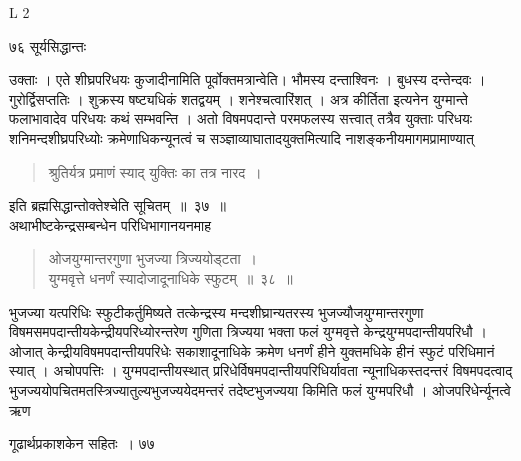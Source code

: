 \documentclass[11pt, openany]{book}
\begin{document}
{\tiny{L 2}}

\newpage

\noindent७६ \hspace{4cm} सूर्यसिद्धान्तः
\vspace{1cm}

\begin{sloppypar}
\noindent उक्ताः । एते शीघ्रपरिधयः कुजादीनामिति पूर्वोक्तमत्रान्वेति। भौमस्य दन्ताश्विनः । बुधस्य दन्तेन्दवः । गुरोर्द्विसप्ततिः । शुक्रस्य षष्ट्यधिकं शतद्वयम् । शनेश्चत्वारिंशत् । अत्र कीर्तिता इत्यनेन युग्मान्ते फलाभावादेव परिधयः कथं सम्भवन्ति । अतो विषमपदान्ते परमफलस्य सत्त्वात् तत्रैव युक्ताः परिधयः शनिमन्दशीघ्रपरिध्योः क्रमेणाधिकन्यूनत्वं च सञ्ज्ञाव्याघातादयुक्तमित्यादि नाशङ्कनीयमागमप्रामाण्यात्\textendash
\end{sloppypar}


\begin{quote}
{\qt श्रुतिर्यत्र प्रमाणं स्याद् युक्तिः का तत्र नारद~।}
\end{quote}
\begin{sloppypar}

इति ब्रह्मसिद्धान्तोक्तेश्चेति सूचितम्~॥~३७~॥\\
अथाभीष्टकेन्द्रसम्बन्धेन परिधिभागानयनमाह\textendash
\end{sloppypar}
\begin{quote}

{\ssi ओजयुग्मान्तरगुणा भुजज्या त्रिज्ययोड्टता~।\\
युग्मवृत्ते धनर्णं स्यादोजादूनाधिके स्फुटम्~॥~३८~॥}
\end{quote}
\begin{sloppypar}
भुजज्या यत्परिधिः स्फुटीकर्तुमिष्यते तत्केन्द्रस्य मन्दशीघ्रान्यतरस्य भुजज्यौजयुग्मान्तरगुणा विषमसमपदान्तीयकेन्द्रीयपरिध्योरन्तरेण गुणिता त्रिज्यया भक्ता फलं युग्मवृत्ते केन्द्रयुग्मपदान्तीयपरिधौ । ओजात् केन्द्रीयविषमपदान्तीयपरिधेः सकाशादूनाधिके क्रमेण धनर्णं हीने युक्तमधिके हीनं स्फुटं परिधिमानं स्यात् । अचोपपत्तिः । युग्मपदान्तीयस्थात् प्ररिधेर्विषमपदान्तीयपरिधिर्यावता न्यूनाधिकस्तदन्तरं विषमपदत्वाद् भुजज्ययोपचितमतस्त्रिज्यातुल्यभुजज्ययेदमन्तरं तदेष्टभुजज्यया किमिति फलं युग्मपरिधौ । ओजपरिधेर्न्यूनत्वे ऋण\textendash
\end{sloppypar}

\newpage

\hspace{3cm}गूढार्थप्रकाशकेन सहितः~। \hfill ७७
\vspace{1cm}
\end{document}

